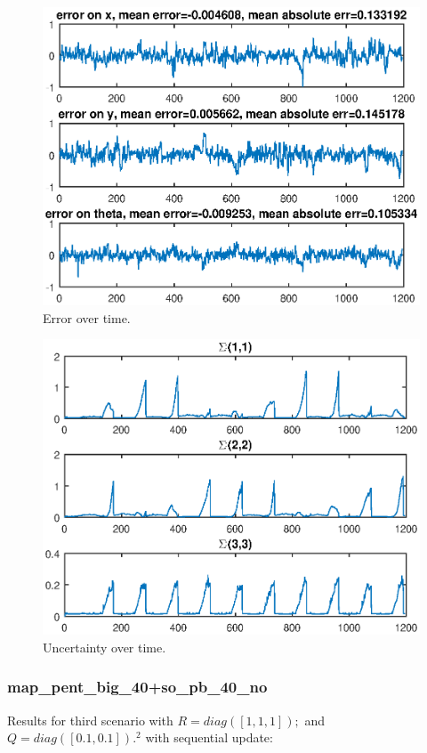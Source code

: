 \documentclass[12pt]{article}
\begin{document}
\begin{figure}[htbp]
 \centering
 \includegraphics[width=\textwidth]{test2_fig2}
 \caption{Error over time.}
\end{figure}
\begin{figure}[htbp]
 \centering
 \includegraphics[width=\textwidth]{test2_fig3}
 \caption{Uncertainty over time.}
\end{figure}

\subsubsection*{map\_pent\_big\_40+so\_pb\_40\_no}
Results for third scenario with \(R=diag([1,1,1]);\) and \(Q=diag([0.1,0.1]).^2\) with sequential update:
\end{document}
